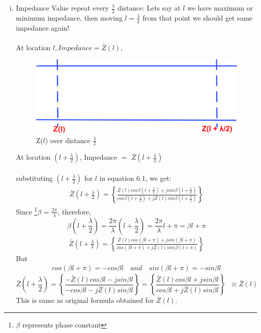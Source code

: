 \begin{enumerate}[(i)]
\item Impedance Value repeat every $\frac{\lambda}{2}$ distance: Lets say at $l$ we have maximum or minimum impedance, then moving $l=\frac{\lambda}{2}$ from that point we should get same impedance again!\\\\
At location $l , Impedance =\bar{Z}(l),$
\begin{figure}[h]
\centering
\includegraphics[width=0.7\linewidth]{./graphics/astyui;f}
\caption{Z($l$) over distance $\frac{\lambda}{2}$}
\label{fig:astyuif}
\end{figure}

At location ${(l+\frac{\lambda}{2})}$, Impedance  $=$ $\bar{Z}(l+\frac{\lambda}{2})$\\\\
substituting ${(l+\frac{\lambda}{2})}$ for $l$ in equation $6.1$, we get: 
\begin{align*}
\bar{Z}(l+\frac{\lambda}{2}) = \left\lbrace \frac{\bar{Z}(l)cos\beta (l+\frac{\lambda}{2}) + jsin\beta (l+\frac{\lambda}{2})}{cos\beta (l+\frac{\lambda}{2}) + j\bar{Z}(l)sin\beta (l+\frac{\lambda}{2})}\right\rbrace 
\end{align*}
Since \footnote{$\beta$ represents phase constant}$\beta$ = $ \frac{2\pi}{\lambda}$, therefore,
\begin{dmath*}
\beta(l+\frac{\lambda}{2})=\frac{2\pi}{\lambda}(l+\frac{\lambda}{2})=\frac{2\pi}{\lambda}l+\pi=\beta l+\pi
\end{dmath*}
\begin{align*}
\bar{Z}(l+\frac{\lambda}{2}) = \left\lbrace \frac{\bar{Z}(l)cos(\beta l+\pi) + jsin(\beta l+\pi)}{cos(\beta l+\pi) + j\bar{Z}(l)sin(\beta (l+\pi)}\right\rbrace 
\end{align*}
But 
\begin{align*} 
cos(\beta l+\pi)=-cos\beta l \quad and \quad sin(\beta l+\pi)=-sin\beta l
\end{align*}
\begin{dmath*}
\bar{Z}(l+\frac{\lambda}{2})=\left\lbrace \frac{-\bar{Z}(l)cos\beta l - jsin\beta l}{-cos\beta l - j\bar{Z}(l)sin\beta l}\right\rbrace = \left\lbrace \frac{\bar{Z}(l)cos\beta l + jsin\beta l}{cos\beta l + j\bar{Z}(l)sin\beta l}\right\rbrace\;\;\equiv \bar{Z}(l)
\end{dmath*} 
This is same as original formula obtained for $\bar{Z}(l)$.


\end{enumerate}
